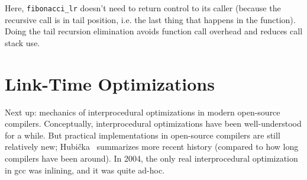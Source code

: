 Here, \texttt{fibonacci\_lr} doesn't need to return control to its caller
(because the recursive call is in tail position, i.e. the last thing that happens
in the function). Doing the tail recursion elimination avoids
function call overhead and reduces call stack use.

\section*{Link-Time Optimizations}
Next up: mechanics of interprocedural optimizations in modern open-source
compilers. Conceptually, interprocedural optimizations have been well-understood
for a while. But practical implementations in open-source compilers are still
relatively new; Hubi\v{c}ka~\cite{hubicka14:_linkt_gcc} summarizes more recent history
(compared to how long compilers have been around).
In 2004, the only real interprocedural optimization in gcc was inlining, and it was
quite ad-hoc.

